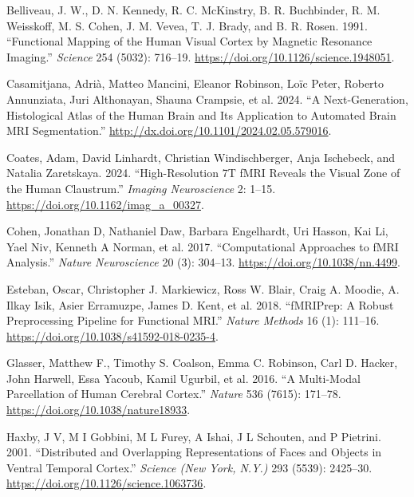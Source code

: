 \documentclass[
  letterpaper,
]{report}
\newlength{\cslhangindent}
\newenvironment{CSLReferences}[2] %
 {\begin{list}{}{%
  \setlength{\itemindent}{0pt}
  \setlength{\leftmargin}{0pt}
  \setlength{\parsep}{0pt}
  \ifodd #1
   \setlength{\leftmargin}{\cslhangindent}
   \setlength{\itemindent}{-1\cslhangindent}
  \fi
  \setlength{\itemsep}{#2\baselineskip}}}
 {\end{list}}
\begin{document}
\label{refs}
\begin{CSLReferences}{1}{0}
Belliveau, J. W., D. N. Kennedy, R. C. McKinstry, B. R. Buchbinder, R.
M. Weisskoff, M. S. Cohen, J. M. Vevea, T. J. Brady, and B. R. Rosen.
1991. {``Functional Mapping of the Human Visual Cortex by Magnetic
Resonance Imaging.''} \emph{Science} 254 (5032): 716--19.
\url{https://doi.org/10.1126/science.1948051}.

Casamitjana, Adrià, Matteo Mancini, Eleanor Robinson, Loïc Peter,
Roberto Annunziata, Juri Althonayan, Shauna Crampsie, et al. 2024. {``A
Next-Generation, Histological Atlas of the Human Brain and Its
Application to Automated Brain MRI Segmentation.''}
\url{http://dx.doi.org/10.1101/2024.02.05.579016}.

Coates, Adam, David Linhardt, Christian Windischberger, Anja Ischebeck,
and Natalia Zaretskaya. 2024. {``High-Resolution 7T fMRI Reveals the
Visual Zone of the Human Claustrum.''} \emph{Imaging Neuroscience} 2:
1--15. \url{https://doi.org/10.1162/imag_a_00327}.

Cohen, Jonathan D, Nathaniel Daw, Barbara Engelhardt, Uri Hasson, Kai
Li, Yael Niv, Kenneth A Norman, et al. 2017. {``Computational Approaches
to fMRI Analysis.''} \emph{Nature Neuroscience} 20 (3): 304--13.
\url{https://doi.org/10.1038/nn.4499}.

Esteban, Oscar, Christopher J. Markiewicz, Ross W. Blair, Craig A.
Moodie, A. Ilkay Isik, Asier Erramuzpe, James D. Kent, et al. 2018.
{``fMRIPrep: A Robust Preprocessing Pipeline for Functional MRI.''}
\emph{Nature Methods} 16 (1): 111--16.
\url{https://doi.org/10.1038/s41592-018-0235-4}.

Glasser, Matthew F., Timothy S. Coalson, Emma C. Robinson, Carl D.
Hacker, John Harwell, Essa Yacoub, Kamil Ugurbil, et al. 2016. {``A
Multi-Modal Parcellation of Human Cerebral Cortex.''} \emph{Nature} 536
(7615): 171--78. \url{https://doi.org/10.1038/nature18933}.

Haxby, J V, M I Gobbini, M L Furey, A Ishai, J L Schouten, and P
Pietrini. 2001. {``Distributed and Overlapping Representations of Faces
and Objects in Ventral Temporal Cortex.''} \emph{Science (New York,
N.Y.)} 293 (5539): 2425--30.
\url{https://doi.org/10.1126/science.1063736}.


\end{CSLReferences}
\end{document}
